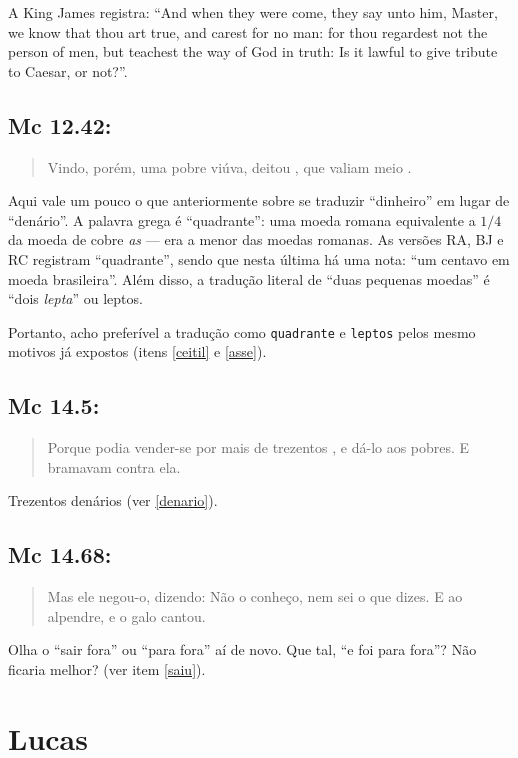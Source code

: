 A King James registra: ``And when they were come, they say unto him,
Master, we know that thou art true, and carest for no man: for thou
regardest not the person of men, but teachest the way of God in truth:
Is it lawful to give tribute to Caesar, or not?''.

\subsection*{Mc 12.42:}
\begin{quote}
    \small
Vindo, porém, uma pobre viúva, deitou , que valiam meio .
\end{quote}

Aqui vale um pouco o que anteriormente sobre se traduzir ``dinheiro''
em lugar de ``denário''. A palavra grega é ``quadrante'': uma moeda
romana equivalente a $1/4$ da moeda de cobre \emph{as} --- era a menor
das moedas romanas. As versões RA, BJ e RC registram ``quadrante'',
sendo que nesta última há uma nota: ``um centavo em moeda
brasileira''. Além disso, a tradução literal de ``duas pequenas
moedas'' é ``dois \emph{lepta}'' ou leptos.

Portanto, acho preferível a tradução como \texttt{quadrante} e \texttt{leptos} pelos mesmo motivos já expostos (itens \ref{ceitil} e \ref{asse}).

\subsection*{Mc 14.5:}
\begin{quote}
    \small
Porque podia vender-se por mais de trezentos , e dá-lo aos pobres. E bramavam contra ela.
\end{quote}

Trezentos denários (ver \ref{denario}).

\subsection*{Mc 14.68:}
\begin{quote}
    \small
Mas ele negou-o, dizendo: Não o conheço, nem sei o que
dizes. E  ao alpendre, e o galo cantou.
    \end{quote}
    
Olha o ``sair fora'' ou ``para fora'' aí de novo. Que tal, ``e foi para fora''? Não ficaria melhor? (ver item \ref{saiu}).

\section{Lucas}
